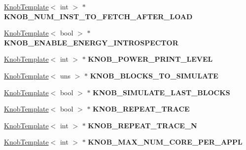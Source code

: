 \begin{DoxyCompactItemize}
\item 
\hypertarget{classall__knobs__c_ad05354d2e88df60ca43cf047cd08ebdf}{
\hyperlink{classKnobTemplate}{KnobTemplate}$<$ int $>$ $\ast$ {\bfseries KNOB\_\-NUM\_\-INST\_\-TO\_\-FETCH\_\-AFTER\_\-LOAD}}
\label{classall__knobs__c_ad05354d2e88df60ca43cf047cd08ebdf}

\item 
\hypertarget{classall__knobs__c_a0eaa9679da4772610c245c7bad1c324b}{
\hyperlink{classKnobTemplate}{KnobTemplate}$<$ bool $>$ $\ast$ {\bfseries KNOB\_\-ENABLE\_\-ENERGY\_\-INTROSPECTOR}}
\label{classall__knobs__c_a0eaa9679da4772610c245c7bad1c324b}

\item 
\hypertarget{classall__knobs__c_a40b21519e4578c0a512e5d97d5a5ede6}{
\hyperlink{classKnobTemplate}{KnobTemplate}$<$ int $>$ $\ast$ {\bfseries KNOB\_\-POWER\_\-PRINT\_\-LEVEL}}
\label{classall__knobs__c_a40b21519e4578c0a512e5d97d5a5ede6}

\item 
\hypertarget{classall__knobs__c_a52202fc4590ffec06df2af0563eafb4f}{
\hyperlink{classKnobTemplate}{KnobTemplate}$<$ uns $>$ $\ast$ {\bfseries KNOB\_\-BLOCKS\_\-TO\_\-SIMULATE}}
\label{classall__knobs__c_a52202fc4590ffec06df2af0563eafb4f}

\item 
\hypertarget{classall__knobs__c_aa87a37ea066ac7207f991a917aacd950}{
\hyperlink{classKnobTemplate}{KnobTemplate}$<$ bool $>$ $\ast$ {\bfseries KNOB\_\-SIMULATE\_\-LAST\_\-BLOCKS}}
\label{classall__knobs__c_aa87a37ea066ac7207f991a917aacd950}

\item 
\hypertarget{classall__knobs__c_a083a3fd4a0e0344a212579a3b340583f}{
\hyperlink{classKnobTemplate}{KnobTemplate}$<$ bool $>$ $\ast$ {\bfseries KNOB\_\-REPEAT\_\-TRACE}}
\label{classall__knobs__c_a083a3fd4a0e0344a212579a3b340583f}

\item 
\hypertarget{classall__knobs__c_a2689db82e3c671f973981b1cdadd0808}{
\hyperlink{classKnobTemplate}{KnobTemplate}$<$ int $>$ $\ast$ {\bfseries KNOB\_\-REPEAT\_\-TRACE\_\-N}}
\label{classall__knobs__c_a2689db82e3c671f973981b1cdadd0808}

\item 
\hypertarget{classall__knobs__c_ae75e12748d9225c9829afa4867664388}{
\hyperlink{classKnobTemplate}{KnobTemplate}$<$ int $>$ $\ast$ {\bfseries KNOB\_\-MAX\_\-NUM\_\-CORE\_\-PER\_\-APPL}}
\label{classall__knobs__c_ae75e12748d9225c9829afa4867664388}


\end{DoxyCompactItemize}
